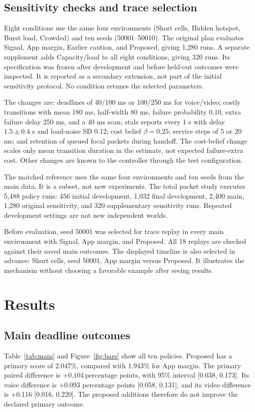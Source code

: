 \documentclass[11pt,a4paper]{article}
\newcommand{\pp}{\,\text{percentage points}}
\begin{document}
\subsection{Sensitivity checks and trace selection}
Eight conditions use the same four environments (Short cells, Hidden hotspot, Burst load, Crowded) and ten seeds (50001--50010). The original plan evaluates Signal, App margin, Earlier caution, and Proposed, giving 1,280 runs. A separate supplement adds Capacity/load to all eight conditions, giving 320 runs. Its specification was frozen after development and before held-out outcomes were inspected. It is reported as a secondary extension, not part of the initial sensitivity protocol. No condition retunes the selected parameters.

The changes are: deadlines of 40/100 ms or 100/250 ms for voice/video; costly transitions with mean 180 ms, half-width 80 ms, failure probability 0.10, extra failure delay 250 ms, and a 40 ms scan; stale reports every 1 s with delay $1.5\pm0.4$ s and load-noise SD 0.12; cost belief $\beta=0.25$; service steps of 5 or 20 ms; and retention of queued focal packets during handoff. The cost-belief change scales only mean transition duration in the estimate, not expected failure-extra cost. Other changes are known to the controller through the test configuration.

The matched reference uses the same four environments and ten seeds from the main data. It is a subset, not new experiments. The total packet study executes 5,488 policy runs: 456 initial development, 1,032 final development, 2,400 main, 1,280 original sensitivity, and 320 supplementary sensitivity runs. Repeated development settings are not new independent worlds.

Before evaluation, seed 50001 was selected for trace replay in every main environment with Signal, App margin, and Proposed. All 18 replays are checked against their saved main outcomes. The displayed timeline is also selected in advance: Short cells, seed 50001, App margin versus Proposed. It illustrates the mechanism without choosing a favorable example after seeing results.

\section{Results}
\subsection{Main deadline outcomes}
Table~\ref{tab:main} and Figure~\ref{fig:bars} show all ten policies. Proposed has a primary score of 2.047\%, compared with 1.943\% for App margin. The primary paired difference is $+0.104\pp$, with 95\% interval [0.038, 0.173]. Its voice difference is +0.093 percentage points [0.058, 0.131], and its video difference is +0.116 [0.016, 0.220]. The proposed additions therefore do not improve the declared primary outcome.
\end{document}
